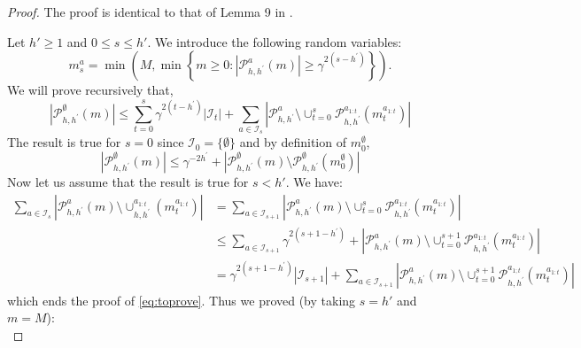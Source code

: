 \documentclass[runningheads, envcountsame, a4paper]{llncs}
\newcommand{\citep}{\cite}
\begin{document}
\begin{proof}
The proof is identical to that of Lemma 9 in \citep{Bubeck2010}.

\noindent
Let $h'\geq 1$ and $0 \leq s \leq h'$. We introduce the following random variables:
\begin{equation*}
m_{s}^{a}=\min \left(M, \min \left\{m \geq 0 :\left|\mathcal{P}_{h, h^{\prime}}^{a}(m)\right| \geq \gamma^{2\left(s-h^{\prime}\right)}\right\}\right).
\end{equation*}
We will prove recursively that,
\begin{equation}
\label{eq:toprove}
\left|\mathcal{P}_{h, h^{\prime}}^{\emptyset}(m)\right| \leq \sum_{t=0}^{s} \gamma^{2\left(t-h^{\prime}\right)}\left|\mathcal{I}_{t}\right|+\sum_{a \in \mathcal{I}_{s}}\left|\mathcal{P}_{h, h^{\prime}}^{a} \setminus \cup_{t=0}^{s} \mathcal{P}_{h, h^{\prime}}^{a_{1:t}}\left(m_{t}^{a_{1:t}}\right)\right|
\end{equation}
The result is true for $s = 0$ since $\mathcal{I}_0 = \{\emptyset\}$ and by definition of $m^\emptyset_0$,
\begin{equation*}
\left|\mathcal{P}_{h, h^{\prime}}^{\emptyset}(m)\right| \leq \gamma^{-2 h^{\prime}}+\left|\mathcal{P}_{h, h^{\prime}}^{\emptyset}(m) \setminus \mathcal{P}_{h, h^{\prime}}^{\emptyset}\left(m_{0}^{\emptyset}\right)\right|
\end{equation*}
Now let us assume that the result is true for $s<h'$. We have:
\begin{align*}
\sum_{a \in \mathcal{I}_{s}}\left|\mathcal{P}_{h, h^{\prime}}^{a}(m) \setminus \cup_{h, h^{\prime}}^{a_{1 : t}}\left(m_{t}^{a_{1 : t}}\right)\right|&=\sum_{a \in \mathcal{I}_{s+1}}\left|\mathcal{P}_{h, h^{\prime}}^{a}(m) \setminus \cup_{t=0}^{s} \mathcal{P}_{h, h^{\prime}}^{a_{1 : t}}\left(m_{t}^{a_{1 : t}}\right)\right|\\
&\leq \sum_{a \in \mathcal{I}_{s+1}} \gamma^{2\left(s+1-h^{\prime}\right)}+\left|\mathcal{P}_{h, h^{\prime}}^{a}(m) \setminus \cup_{t=0}^{s+1} \mathcal{P}_{h, h^{\prime}}^{a_{1 : t}}\left(m_{t}^{a_{1 : t}}\right)\right|\\
&= \gamma^{2\left(s+1-h^{\prime}\right)}\left|\mathcal{I}_{s+1}\right|+\sum_{a \in \mathcal{I}_{s+1}}\left|\mathcal{P}_{h, h^{\prime}}^{a}(m) \setminus \cup_{t=0}^{s+1} \mathcal{P}_{h, h^{\prime}}^{a_{1 ; t}}\left(m_{t}^{a_{1 : t}}\right)\right|
\end{align*}
which ends the proof of \eqref{eq:toprove}. Thus we proved (by taking $s=h'$ and $m=M$):
\begin{equation*}

\end{equation*}
\end{proof}
\end{document}
